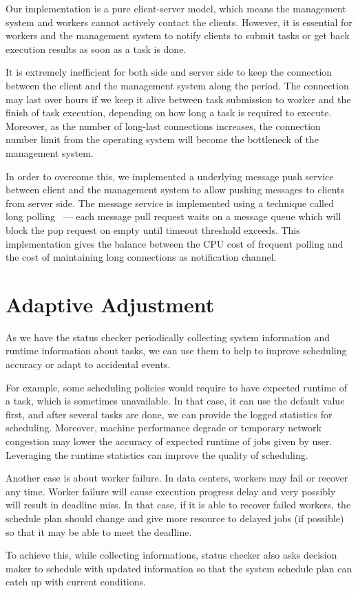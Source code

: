 Our implementation is a pure client-server model, which means the
management system and workers cannot actively contact the clients.
However, it is essential for workers and the management system to notify
clients to submit tasks or get back execution results as soon as a task
is done.

It is extremely inefficient for both side and server side to keep the
connection between the client and the management system along the
period.
The connection may last over hours if we keep it alive between task
submission to worker and the finish of task execution, depending on how
long a task is required to execute.
Moreover, as the number of long-last connections increases, the
connection number limit from the operating system will become the
bottleneck of the management system.

In order to overcome this, we implemented a underlying message push
service between client and the management system to allow pushing
messages to clients from server side.
The message service is implemented using a technique called long
polling~\cite{cite:push-pull} --- each message pull request waits on a
message queue which will block the pop request on empty until timeout
threshold exceeds.
This implementation gives the balance between the CPU cost of frequent
polling and the cost of maintaining long connections as notification
channel.

\section{Adaptive Adjustment}

As we have the status checker periodically collecting system information
and runtime information about tasks, we can use them to help to improve
scheduling accuracy or adapt to accidental events.

For example, some scheduling policies would require to have expected
runtime of a task, which is sometimes unavailable.
In that case, it can use the default value first, and after several
tasks are done, we can provide the logged statistics for scheduling.
Moreover, machine performance degrade or temporary network congestion
may lower the accuracy of expected runtime of jobs given by user.
Leveraging the runtime statistics can improve the quality of
scheduling.

Another case is about worker failure.
In data centers, workers may fail or recover any time.
Worker failure will cause execution progress delay and very possibly
will result in deadline miss.
In that case, if it is able to recover failed workers, the schedule plan
should change and give more resource to delayed jobs (if possible) so
that it may be able to meet the deadline.

To achieve this, while collecting informations, status checker also
asks decision maker to schedule with updated information so that the
system schedule plan can catch up with current conditions.
